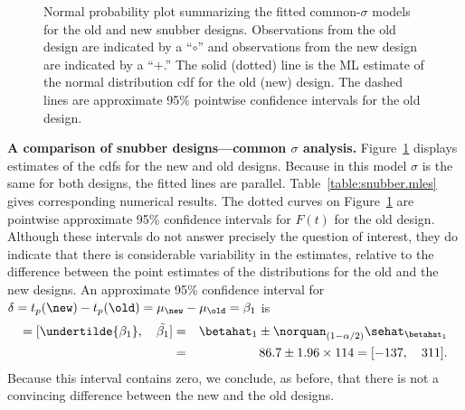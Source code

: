 \begin{figure}
\caption{Normal probability plot summarizing 
the fitted common-$\sigma$ models for 
the old and new snubber designs. 
Observations from the old design are indicated by a ``$\circ$'' and
observations from the new design are indicated by a ``$+$.''
The solid (dotted) line is the ML estimate of the normal distribution
cdf for the old (new) design. The dashed lines are
approximate 95\% pointwise
confidence intervals for the old design.}
\label{figure:snubber.gmodel.norm.ps}
\end{figure}

\begin{example}
{\bf A comparison of snubber designs---common $\sigma$ analysis.}
\label{example:snubber.common.sigma}
Figure~\ref{figure:snubber.gmodel.norm.ps} displays estimates of the
cdfs for the new and old designs. Because in this model $\sigma$ is
the same for both designs, the fitted lines are parallel.
Table~\ref{table:snubber.mles} gives corresponding numerical results.
The dotted curves on Figure~\ref{figure:snubber.gmodel.norm.ps} are
pointwise approximate 95\% confidence intervals for $F(t)$ for the old
design. Although these intervals do not answer precisely the question
of interest, they do indicate that there is considerable variability
in the estimates, relative to the difference between the point
estimates of the distributions for the old and the new designs.  An
approximate 95\% confidence interval for $\delta = t_{p}(\new)
-t_{p}(\old)=\mu_{\new} -
\mu_{\old}=\beta_{1}$ is
\begin{eqnarray*}
[\undertilde{\delta}, \quad \tilde{\delta}]= 
[\undertilde{\beta_{1}}, \quad \tilde{\beta_{1}}] &=& 
	\betahat_{1} \pm 
     \norquan_{(1-\alpha/2)} \sehat_{\betahat_{1}}\\
	&=& 86.7 \pm 1.96 \times 114 = [-137, \quad  311].
\end{eqnarray*}
Because this interval contains zero, we conclude, as before,  
that there is not a convincing difference
between the new and the old designs.
\end{example}

